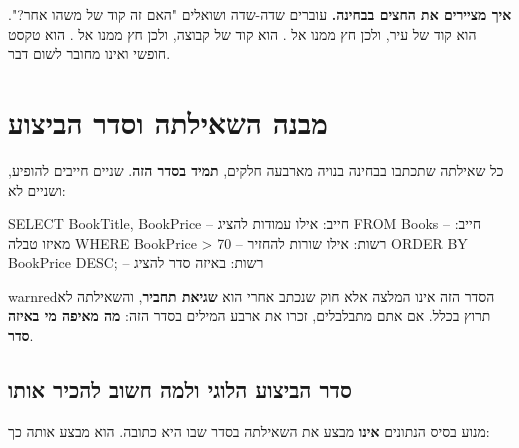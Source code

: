 \documentclass[11pt,a4paper]{article}
\begin{document}
\vspace{2pt}
\textbf{איך מציירים את החצים בבחינה.} עוברים שדה-שדה ושואלים "האם זה קוד של משהו אחר?".  הוא קוד של עיר, ולכן חץ ממנו אל .  הוא קוד של קבוצה, ולכן חץ ממנו אל .  הוא טקסט חופשי \textendash{} ואינו מחובר לשום דבר.

\newpage
\section{מבנה השאילתה וסדר הביצוע}

כל שאילתה שתכתבו בבחינה בנויה מארבעה חלקים, \textbf{תמיד בסדר הזה}. שניים חייבים להופיע, ושניים לא:

\begin{otherlanguage}{english}
\begin{sqlverb}
SELECT     BookTitle, BookPrice     -- חייב:  אילו עמודות להציג
FROM       Books                    -- חייב:  מאיזו טבלה
WHERE      BookPrice > 70           -- רשות:  אילו שורות להחזיר
ORDER BY   BookPrice DESC;          -- רשות:  באיזה סדר להציג
\end{sqlverb}
\end{otherlanguage}

\begin{notepanel}{warnred}{הסדר הזה אינו המלצה אלא חוק}
 שנכתב אחרי  הוא \textbf{שגיאת תחביר}, והשאילתה לא תרוץ בכלל. אם אתם מתבלבלים, זכרו את ארבע המילים בסדר הזה: \textbf{מה \textendash{} מאיפה \textendash{} מי \textendash{} באיזה סדר}.
\end{notepanel}

\subsection{סדר הביצוע הלוגי \textendash{} ולמה חשוב להכיר אותו}

מנוע בסיס הנתונים \textbf{אינו} מבצע את השאילתה בסדר שבו היא כתובה. הוא מבצע אותה כך:
\end{document}
